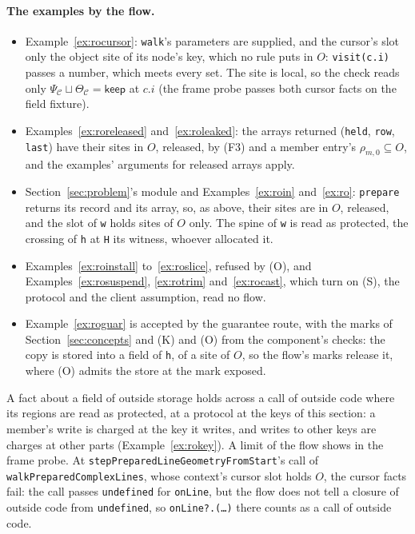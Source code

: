 \documentclass[10pt,a4paper]{article}
\theoremstyle{definition}
\theoremstyle{remark}
\newcommand{\kw}[1]{\mathsf{#1}}
\newcommand{\keep}{\kw{keep}}
\newcommand{\code}[1]{\texttt{#1}}
\newcommand{\cC}{\mathcal{C}}
\begin{document}
\paragraph{The examples by the flow.}
\begin{itemize}[leftmargin=1.5em,itemsep=2pt]
\item Example~\ref{ex:rocursor}: \code{walk}'s parameters are supplied, and
the cursor's slot only the object site of its node's key, which no rule puts in
$O$: \code{visit(c.i)} passes a number, which meets every set. The site is
local, so the check reads only $\Psi_\cC\sqcup\Theta_\cC=\keep$ at $c.i$
(the frame probe passes both cursor facts on the field fixture).
\item Examples~\ref{ex:roreleased} and~\ref{ex:roleaked}: the arrays
returned (\code{held}, \code{row}, \code{last}) have their sites in $O$,
released, by (F3) and a member entry's $\rho_{m,0}\subseteq O$, and the examples' arguments for released arrays apply.
\item Section~\ref{sec:problem}'s module and Examples~\ref{ex:roin}
and~\ref{ex:ro}: \code{prepare} returns its record and its array, so, as
above, their sites are in $O$, released, and the slot of \code{w} holds sites of $O$
only. The spine of \code{w} is read as protected, the crossing of \code{h}
at \code{H} its witness, whoever allocated it.
\item Examples~\ref{ex:roinstall} to~\ref{ex:roslice}, refused by (O), and
Examples~\ref{ex:rosuspend}, \ref{ex:rotrim} and~\ref{ex:rocast}, which
turn on (S), the protocol and the client assumption, read no flow.
\item Example~\ref{ex:roguar} is accepted by the guarantee route, with
the marks of Section~\ref{sec:concepts} and (K) and (O) from the
component's checks: the copy is stored into a field of \code{h}, of a
site of $O$, so the flow's marks release it, where (O) admits the store
at the mark exposed.
\end{itemize}
{\sloppy A fact about a field of outside storage holds across a call of
outside code where its regions are read as protected, at a protocol at the
keys of this section: a member's write is charged at the key it writes, and
writes to other keys are charges at other parts (Example~\ref{ex:rokey}).
A limit of the flow shows in the frame probe. At \code{stepPreparedLineGeometryFromStart}'s call of
\code{walkPreparedComplexLines}, whose context's cursor slot holds $O$,
the cursor facts fail: the call passes \code{undefined} for \code{onLine},
but the flow does not tell a closure of outside code from \code{undefined},
so \code{onLine?.(\ldots)} there counts as a call of outside code.\par}
\end{document}
